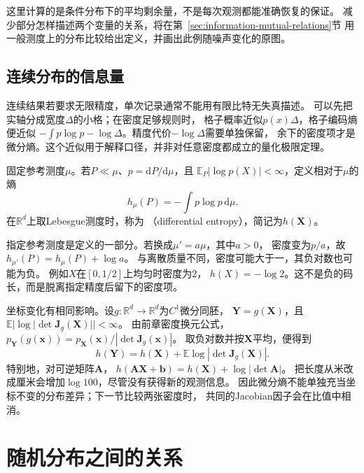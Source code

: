 这里计算的是条件分布下的平均剩余量，不是每次观测都能准确恢复的保证。
减少部分怎样描述两个变量的关系，将在第~\ref{sec:information-mutual-relations}节
用一般测度上的分布比较给出定义，并画出此例随噪声变化的原图。

\subsection{连续分布的信息量}
\label{sec:information-continuous-information}

连续结果若要求无限精度，单次记录通常不能用有限比特无失真描述。
可以先把实轴分成宽度\(\Delta\)的小格；在密度足够规则时，
格子概率近似\(p(x)\Delta\)，格子编码熵便近似
\(-\int p\log p-\log\Delta\)。精度代价\(-\log\Delta\)需要单独保留，
余下的密度项才是微分熵。这个近似用于解释口径，并非对任意密度都成立的量化极限定理。

\begin{definition}[微分熵]
\label{def:information-differential-entropy}
固定参考测度\(\mu\)。若\(P\ll\mu\)、\(p=\mathrm dP/\mathrm d\mu\)，且
\(\mathbb E_P|\log p(X)|<\infty\)，定义相对于\(\mu\)的熵
\[
  h_\mu(P)=-\int p\log p\,\mathrm d\mu.
\]
在\(\mathbb R^d\)上取Lebesgue测度时，称为
（differential entropy），简记为\(h(\bm X)\)。
\end{definition}

指定参考测度是定义的一部分。若换成\(\mu'=a\mu\)，其中\(a>0\)，
密度变为\(p/a\)，故\(h_{\mu'}(P)=h_\mu(P)+\log a\)。
与离散质量不同，密度可能大于一，其负对数也可能为负。
例如\(X\)在\([0,1/2]\)上均匀时密度为\(2\)，
\(h(X)=-\log2\)。这不是负的码长，而是脱离指定精度后留下的密度项。

坐标变化有相同影响。设\(g:\mathbb R^d\to\mathbb R^d\)为\(C^1\)微分同胚，
\(\bm Y=g(\bm X)\)，且
\(\mathbb E|\log|\det\bm J_g(\bm X)||<\infty\)。
由前章密度换元公式，
\(p_{\bm Y}(g(\bm x))=p_{\bm X}(\bm x)/|\det\bm J_g(\bm x)|\)。
取负对数并按\(\bm X\)平均，便得到
\begin{equation}
  h(\bm Y)=h(\bm X)+
  \mathbb E\log|\det\bm J_g(\bm X)|.
  \label{eq:information-differential-entropy-transform}
\end{equation}
特别地，对可逆矩阵\(\bm A\)，
\(h(\bm A\bm X+\bm b)=h(\bm X)+\log|\det\bm A|\)。
把长度从米改成厘米会增加\(\log100\)，尽管没有获得新的观测信息。
因此微分熵不能单独充当坐标不变的分布差异；下一节比较两张密度时，
共同的Jacobian因子会在比值中相消。

\section{随机分布之间的关系}
\label{sec:information-comparison-identification}

